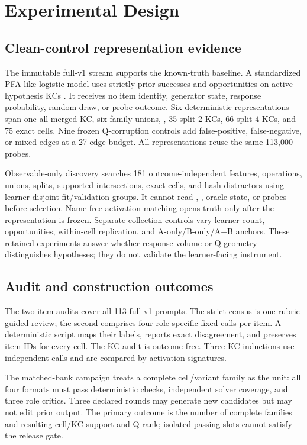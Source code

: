 \section{Experimental Design}
\label{sec:experimental-design}

\subsection{Clean-control representation evidence}

The immutable full-v1 stream supports the known-truth baseline.  A standardized
PFA-like logistic model uses strictly prior successes and opportunities on
active hypothesis KCs \citep{pavlik-etal-2009}.  It receives no item identity,
generator state, response probability, random draw, or probe outcome.  Six
deterministic representations span one all-merged KC, six family unions,
\kstar{}, 35 split-2 KCs, 66 split-4 KCs, and 75 exact cells.  Nine frozen
Q-corruption controls add false-positive, false-negative, or mixed edges at a
27-edge budget.  All representations reuse the same 113,000 probes.

Observable-only discovery searches 181 outcome-independent features,
operations, unions, splits, supported intersections, exact cells, and hash
distractors using learner-disjoint fit/validation groups.  It cannot read
\kstar{}, \qstar{}, oracle state, or probes before selection.  Name-free
activation matching opens truth only after the representation is frozen.
Separate collection controls vary learner count, opportunities, within-cell
replication, and A-only/B-only/A+B anchors.  These retained experiments answer
whether response volume or Q geometry distinguishes hypotheses; they do not
validate the learner-facing instrument.

\subsection{Audit and construction outcomes}

The two item audits cover all 113 full-v1 prompts.  The strict census is one
rubric-guided review; the second comprises four role-specific fixed calls per
item.  A deterministic script maps their labels, reports exact disagreement,
and preserves item IDs for every cell.  The KC audit is outcome-free.  Three KC
inductions use independent calls and are compared by activation signatures.

The matched-bank campaign treats a complete cell/variant family as the unit:
all four formats must pass deterministic checks, independent solver coverage,
and three role critics.  Three declared rounds may generate new candidates but
may not edit prior output.  The primary outcome is the number of complete
families and resulting cell/KC support and Q rank; isolated passing slots cannot
satisfy the release gate.

